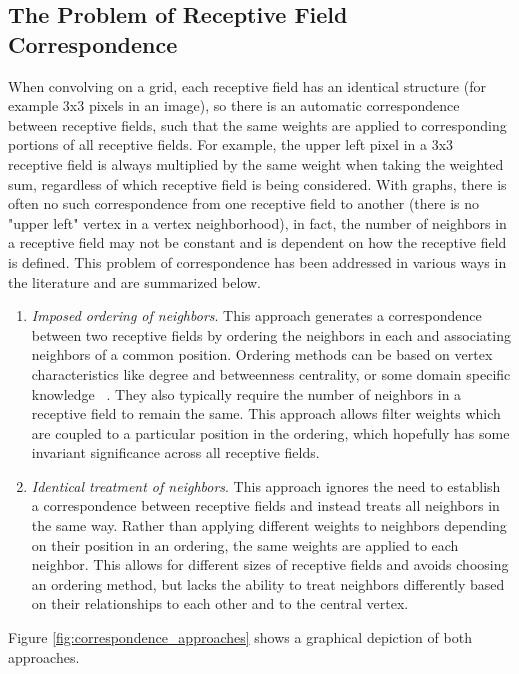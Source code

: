 \subsection{The Problem of Receptive Field Correspondence}
When convolving on a grid, each receptive field has an identical structure (for example 3x3 pixels in an image), so there is an automatic correspondence between receptive fields, such  that the same weights are applied to corresponding portions of all receptive fields. 
For example, the upper left pixel in a 3x3 receptive field is always multiplied by the same weight when taking the weighted sum, regardless of which receptive field is being considered.
With graphs, there is often no such correspondence from one receptive field to another (there is no "upper left" vertex in a vertex neighborhood), in fact, the number of neighbors in a receptive field may not be constant and is dependent on how the receptive field is defined.
This problem of correspondence has been addressed in various ways in the literature and are summarized below. 
\begin{enumerate}
	\item \textit{Imposed ordering of neighbors}. This approach generates a correspondence between two receptive fields by ordering the neighbors in each and associating neighbors of a common position. 
	Ordering methods can be based on vertex characteristics like degree and betweenness centrality, or some domain specific knowledge ~\cite{niepert2016}\cite{duvenaud2015}.
	They also typically require the number of neighbors in a receptive field to remain the same.
	This approach allows filter weights which are coupled to a particular position in the ordering, which hopefully has some invariant significance across all receptive fields.
	
	\item \textit{Identical treatment of neighbors}. This approach ignores the need to establish a correspondence between receptive fields and instead treats all neighbors in the same way.
	Rather than applying different weights to neighbors depending on their position in an ordering, the same weights are applied to each neighbor.
	This allows for different sizes of receptive fields and avoids choosing an ordering method, but lacks the ability to treat neighbors differently based on their relationships to each other and to the central vertex.
\end{enumerate}
Figure \ref{fig:correspondence_approaches} shows a graphical depiction of both approaches.

